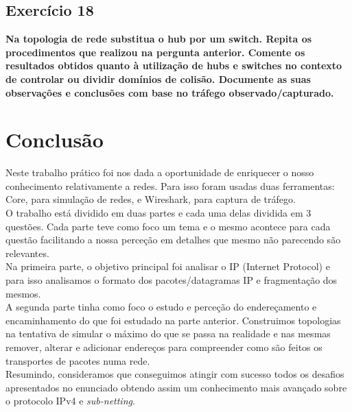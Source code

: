 \documentclass[a4paper]{report}
\begin{document}
\section{Exercício 18}
\textbf{Na topologia de rede substitua o hub por um switch. Repita os
procedimentos que realizou na pergunta anterior. Comente os resultados obtidos
quanto à utilização de hubs e switches no contexto de controlar ou dividir
domínios de colisão. Documente as suas observações e conclusões com base no
tráfego observado/capturado.}


\chapter{Conclusão}
Neste trabalho prático foi nos dada a oportunidade de enriquecer o nosso conhecimento
relativamente a redes. Para isso foram usadas duas ferramentas: Core, para simulação de 
redes, e Wireshark, para captura de tráfego.\\
O trabalho está dividido em duas partes e cada uma delas dividida em 3 questões.
Cada parte teve como foco um tema e o mesmo acontece para cada questão facilitando a
nossa perceção em detalhes que mesmo não parecendo são relevantes.\\
Na primeira parte, o objetivo principal foi analisar o IP (Internet Protocol) e para isso
analisamos o formato dos pacotes/datagramas IP e fragmentação dos mesmos.\\
A segunda parte tinha como foco o estudo e perceção do endereçamento e encaminhamento do
que foi estudado na parte anterior. Construimos topologias na tentativa de simular 
o máximo do que se passa na realidade e nas mesmas remover, alterar e adicionar 
endereços para compreender como são feitos os transportes de pacotes numa rede.\\
Resumindo, consideramos que conseguimos atingir com sucesso todos os
desafios apresentados no enunciado obtendo assim um conhecimento mais avançado
sobre o protocolo IPv4 e \textit{sub-netting}.
\end{document}
